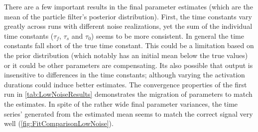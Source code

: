 There are a few important results in the final parameter estimates (which 
are the mean of the particle filter's posterior distribution). First, the time constants vary 
greatly across
runs with different noise realizations, yet the sum of the individual time constants
($\tau_f$, $\tau_s$ and $\tau_0$) seems to be more consistent. In general the 
time constants fall short of the true time constant. This could be a limitation
based on the prior distribution (which notably has an initial mean below the true values) 
or it could be other parameters are compensating. Its also possible that output is insensitive
to differences in the time constants; although varying the activation durations could induce
better estimates.  
The convergence properties of the first run in \autoref{tab:LowNoiseResults} 
demonstrates the migration of parameters to match the estimates. In spite of the
rather wide final parameter variances, the time series'
generated from the estimated mean seems to match the correct signal very well 
(\autoref{fig:FitComparisonLowNoise}).


%

